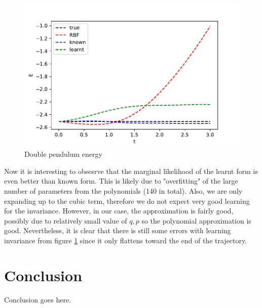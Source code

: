 \documentclass{statsmsc}
\begin{document}
\begin{figure}[H] 
  \includegraphics[width=0.8\linewidth]{../codes/figures/double_pendulum_energy.pdf}
  \centering
  \caption{Double pendulum energy}
  \label{fig:double_pendulum_energy}
\end{figure}
Now it is interesting to obsesrve that the marginal likelihood of the learnt form is even better than known form.
This is likely due to "overfitting" of the large number of parameters from the polynomials (140 in total).
Also, we are only expanding up to the cubic term, therefore we do not expect very good learning for the invariance.
However, in our case, the approximation is fairly good, possibly due to relatively small value of $q, p$ so the polynomial approximation is good.
Nevertheless, it is clear that there is still some errors with learning invariance from figure \ref{fig:double_pendulum_energy} since it only flattens toward the end of the trajectory.

\chapter{Conclusion}


Conclusion goes here. 






%
%
\end{document}
